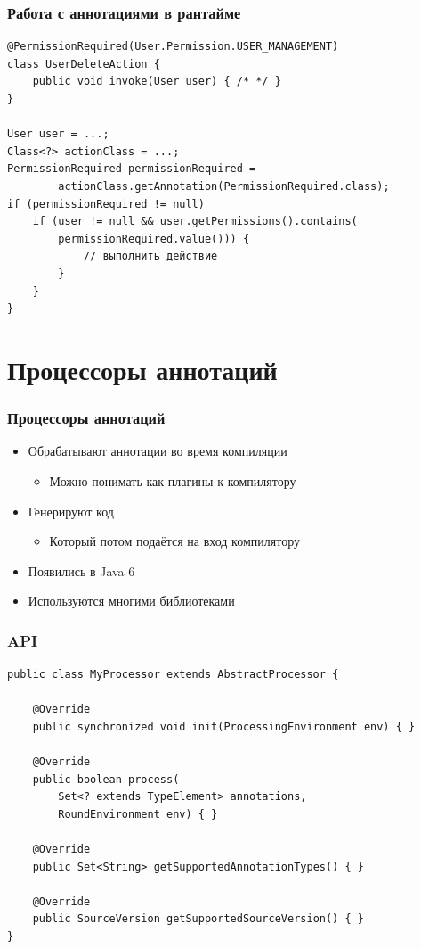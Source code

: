 \documentclass[xetex,mathserif,serif]{beamer}
\begin{document}
	\begin{frame}[fragile]
		\frametitle{Работа с аннотациями в рантайме}
		\begin{verbatim}
@PermissionRequired(User.Permission.USER_MANAGEMENT)
class UserDeleteAction {
    public void invoke(User user) { /* */ }
}

User user = ...;
Class<?> actionClass = ...;
PermissionRequired permissionRequired =
        actionClass.getAnnotation(PermissionRequired.class);
if (permissionRequired != null)
    if (user != null && user.getPermissions().contains(
        permissionRequired.value())) {
            // выполнить действие
        }
    }
}
		\end{verbatim}
	\end{frame}

	\section{Процессоры аннотаций}

	\begin{frame}
		\frametitle{Процессоры аннотаций}
		\begin{itemize}
			\item Обрабатывают аннотации во время компиляции
			\begin{itemize}
				\item Можно понимать как плагины к компилятору
			\end{itemize}
			\item Генерируют код
			\begin{itemize}
				\item Который потом подаётся на вход компилятору
			\end{itemize}
			\item Появились в Java 6
			\item Используются многими библиотеками
		\end{itemize}
	\end{frame}

	\begin{frame}[fragile]
		\frametitle{API}
		\begin{small}
			\begin{verbatim}
public class MyProcessor extends AbstractProcessor {

    @Override
    public synchronized void init(ProcessingEnvironment env) { }

    @Override
    public boolean process(
        Set<? extends TypeElement> annotations, 
        RoundEnvironment env) { }

    @Override
    public Set<String> getSupportedAnnotationTypes() { }

    @Override
    public SourceVersion getSupportedSourceVersion() { }
}
			\end{verbatim}
		\end{small}
	\end{frame}
\end{document}
